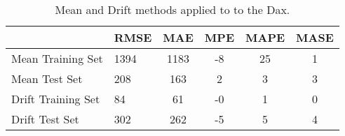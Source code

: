 \begin{table}[ht]
\centering
\caption[Mean and Drift methods applied to 
         to the Dax]{Mean and Drift methods applied to 
         to the Dax.} 
\label{tab:chp_ts:sma}
\begin{tabular}{llcccc}
  \toprule  & RMSE & MAE & MPE & MAPE & MASE \\ 
  \midrule Mean Training Set & 1394 & 1183 & -8 & 25 & 1 \\ 
  Mean Test Set & 208 & 163 & 2 & 3 & 3 \\ 
  Drift Training Set & 84 & 61 & -0 & 1 & 0 \\ 
  Drift Test Set & 302 & 262 & -5 & 5 & 4 \\ 
   \bottomrule \end{tabular}
\end{table}
